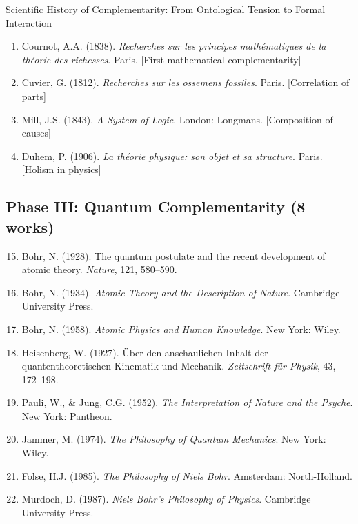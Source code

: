 \begin{chapter}{Scientific History of Complementarity: From Ontological Tension to Formal Interaction}
\begin{enumerate}
    \item Cournot, A.A. (1838). \textit{Recherches sur les principes mathématiques de la théorie des richesses}. Paris. [First mathematical complementarity]

    \item Cuvier, G. (1812). \textit{Recherches sur les ossemens fossiles}. Paris. [Correlation of parts]

    \item Mill, J.S. (1843). \textit{A System of Logic}. London: Longmans. [Composition of causes]

    \item Duhem, P. (1906). \textit{La théorie physique: son objet et sa structure}. Paris. [Holism in physics]
\end{enumerate}

\subsection{Phase III: Quantum Complementarity (8 works)}

\begin{enumerate}
    \setcounter{enumi}{14}
    \item Bohr, N. (1928). The quantum postulate and the recent development of atomic theory. \textit{Nature}, 121, 580--590.

    \item Bohr, N. (1934). \textit{Atomic Theory and the Description of Nature}. Cambridge University Press.

    \item Bohr, N. (1958). \textit{Atomic Physics and Human Knowledge}. New York: Wiley.

    \item Heisenberg, W. (1927). Über den anschaulichen Inhalt der quantentheoretischen Kinematik und Mechanik. \textit{Zeitschrift für Physik}, 43, 172--198.

    \item Pauli, W., \& Jung, C.G. (1952). \textit{The Interpretation of Nature and the Psyche}. New York: Pantheon.

    \item Jammer, M. (1974). \textit{The Philosophy of Quantum Mechanics}. New York: Wiley.

    \item Folse, H.J. (1985). \textit{The Philosophy of Niels Bohr}. Amsterdam: North-Holland.

    \item Murdoch, D. (1987). \textit{Niels Bohr's Philosophy of Physics}. Cambridge University Press.
\end{enumerate}


\end{chapter}
